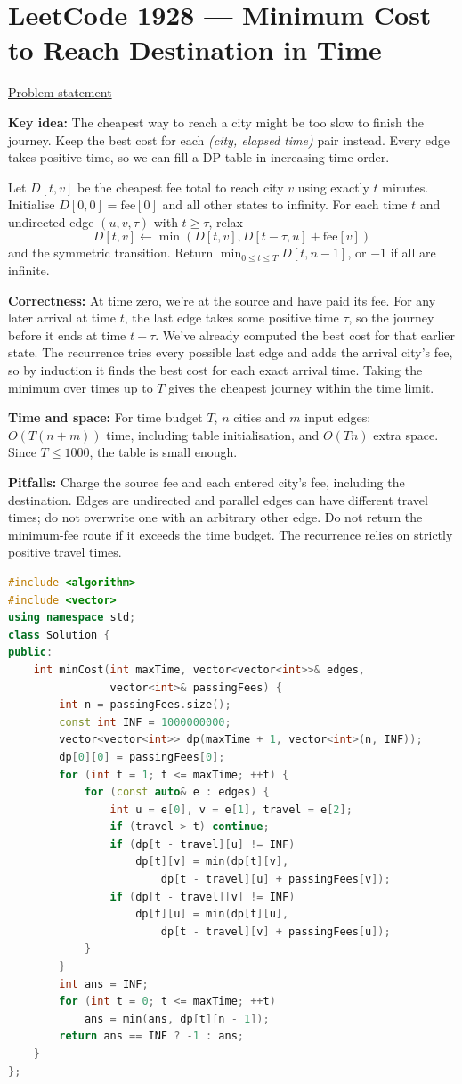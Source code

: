 \documentclass[11pt]{article}
\newcommand{\insight}[1]{\par\medskip\noindent\textbf{Key idea:} #1}
\newcommand{\correct}[1]{\par\textbf{Correctness:} #1}
\newcommand{\bounds}[1]{\par\textbf{Time and space:} #1}
\newcommand{\pitfalls}[1]{\par\textbf{Pitfalls:} #1}
\begin{document}
\section{LeetCode 1928 --- Minimum Cost to Reach Destination in Time}
\href{https://leetcode.com/problems/minimum-cost-to-reach-destination-in-time/}{Problem statement}
\insight{The cheapest way to reach a city might be too slow to finish the journey. Keep the best cost for each \emph{(city, elapsed time)} pair instead. Every edge takes positive time, so we can fill a DP table in increasing time order.}

Let $D[t,v]$ be the cheapest fee total to reach city $v$ using exactly $t$ minutes. Initialise $D[0,0]=\mathrm{fee}[0]$ and all other states to infinity. For each time $t$ and undirected edge $(u,v,\tau)$ with $t\geq\tau$, relax
\[
 D[t,v]\gets\min(D[t,v],D[t-\tau,u]+\mathrm{fee}[v])
\]
and the symmetric transition. Return $\min_{0\leq t\leq T}D[t,n-1]$, or $-1$ if all are infinite.
\correct{At time zero, we're at the source and have paid its fee. For any later arrival at time $t$, the last edge takes some positive time $\tau$, so the journey before it ends at time $t-\tau$. We've already computed the best cost for that earlier state. The recurrence tries every possible last edge and adds the arrival city's fee, so by induction it finds the best cost for each exact arrival time. Taking the minimum over times up to $T$ gives the cheapest journey within the time limit.}
\bounds{For time budget $T$, $n$ cities and $m$ input edges: $O(T(n+m))$ time, including table initialisation, and $O(Tn)$ extra space. Since $T\leq1000$, the table is small enough.}
\pitfalls{Charge the source fee and each entered city's fee, including the destination. Edges are undirected and parallel edges can have different travel times; do not overwrite one with an arbitrary other edge. Do not return the minimum-fee route if it exceeds the time budget. The recurrence relies on strictly positive travel times.}
\begin{lstlisting}[language=C++,caption={P12 --- C++17},label={lst:p12-cpp}]
#include <algorithm>
#include <vector>
using namespace std;
class Solution {
public:
    int minCost(int maxTime, vector<vector<int>>& edges,
                vector<int>& passingFees) {
        int n = passingFees.size();
        const int INF = 1000000000;
        vector<vector<int>> dp(maxTime + 1, vector<int>(n, INF));
        dp[0][0] = passingFees[0];
        for (int t = 1; t <= maxTime; ++t) {
            for (const auto& e : edges) {
                int u = e[0], v = e[1], travel = e[2];
                if (travel > t) continue;
                if (dp[t - travel][u] != INF)
                    dp[t][v] = min(dp[t][v],
                        dp[t - travel][u] + passingFees[v]);
                if (dp[t - travel][v] != INF)
                    dp[t][u] = min(dp[t][u],
                        dp[t - travel][v] + passingFees[u]);
            }
        }
        int ans = INF;
        for (int t = 0; t <= maxTime; ++t)
            ans = min(ans, dp[t][n - 1]);
        return ans == INF ? -1 : ans;
    }
};
\end{lstlisting}
\end{document}
